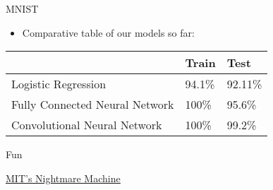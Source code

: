 \begin{frame}{MNIST}
	\begin{itemize}
		\item Comparative table of our models so far:
	\end{itemize}
	\begin{table}[]
		\centering
		\begin{tabular}{lll}
			\cline{2-3}
			                               & Train  & Test    \\ \hline
			Logistic Regression            & 94.1\% & 92.11\% \\
			Fully Connected Neural Network & 100\%  & 95.6\%  \\
			Convolutional Neural Network   & 100\%  & 99.2\%  \\ \hline
		\end{tabular}
	\end{table}
\end{frame}

\begin{frame}{Fun}
	\begin{center}
		\textcolor{blue!75}{\underline{ \href{http://nightmare.mit.edu/}{MIT's Nightmare Machine}}}
	\end{center}
\end{frame}


